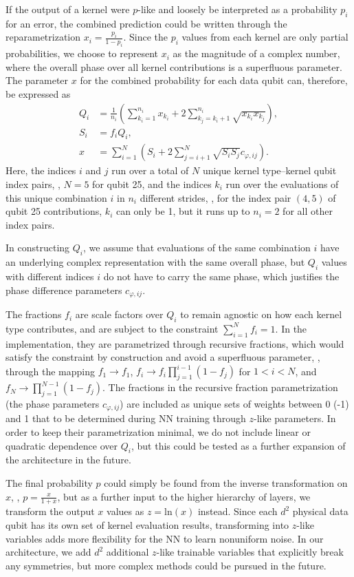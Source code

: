 If the output of a kernel were $p$-like and loosely be interpreted as a probability $p_i$ for an error, the combined prediction could be written through the reparametrization $x_i=\frac{p_i}{1-p_i}$. Since the $p_i$ values from each kernel are only partial probabilities, we choose to represent $x_i$ as the magnitude of a complex number, where the overall phase over all kernel contributions is a superfluous parameter. The parameter $x$ for the combined probability for each data qubit can, therefore, be expressed as
\begin{equation}
\begin{aligned}
Q_i &= \frac{1}{n_i}\left(\sum_{k_i=1}^{n_i} x_{k_i} + 2 \sum_{k_j=k_i+1}^{n_i} \sqrt{x_{k_i} x_{k_j}} \right), \\
S_i &= f_i Q_{i}, \\
x &= \sum_{i=1}^{N} \left( S_i + 2 \sum_{j=i+1}^{N} \sqrt{S_i S_j} c_{\varphi, ij} \right).
\end{aligned}
\label{eq:kernsum}
\end{equation}
Here, the indices $i$ and $j$ run over a total of $N$ unique kernel type--kernel qubit index pairs, \eg, $N=5$ for qubit 25, and the indices $k_i$ run over the evaluations of this unique combination $i$ in $n_i$ different strides, \eg, for the index pair $(4,5)$ of qubit 25 contributions, $k_i$ can only be 1, but it runs up to $n_i=2$ for all other index pairs.

In constructing $Q_i$, we assume that evaluations of the same combination $i$ have an underlying complex representation with the same overall phase, but $Q_i$ values with different indices $i$ do not have to carry the same phase, which justifies the phase difference parameters $c_{\varphi, ij}$.

The fractions $f_i$ are scale factors over $Q_i$ to remain agnostic on how each kernel type contributes, and are subject to the constraint $\sum_{i=1}^{N} f_i = 1$. In the implementation, they are parametrized through recursive fractions, which would satisfy the constraint by construction and avoid a superfluous parameter, \ie, through the mapping $f_1 \to f_1$, $f_i \to f_i\prod_{j=1}^{i-1}\left(1-f_j\right)$ for $1<i<N$, and $f_N \to \prod_{j=1}^{N-1}\left(1-f_j\right)$. The fractions in the recursive fraction parametrization (the phase parameters $c_{\varphi, ij}$) are included as unique sets of weights between 0 (-1) and 1 that to be determined during NN training through $z$-like parameters. In order to keep their parametrization minimal, we do not include linear or quadratic dependence over $Q_i$, but this could be tested as a further expansion of the architecture in the future.

The final probability $p$ could simply be found from the inverse transformation on $x$, \ie, $p=\frac{x}{1+x}$, but as a further input to the higher hierarchy of layers, we transform the output $x$ values as $z=\text{ln}(x)$ instead. Since each $d^2$ physical data qubit has its own set of kernel evaluation results, transforming into $z$-like variables adds more flexibility for the NN to learn nonuniform noise. In our architecture, we add $d^2$ additional $z$-like trainable variables that explicitly break any symmetries, but more complex methods could be pursued in the future.
